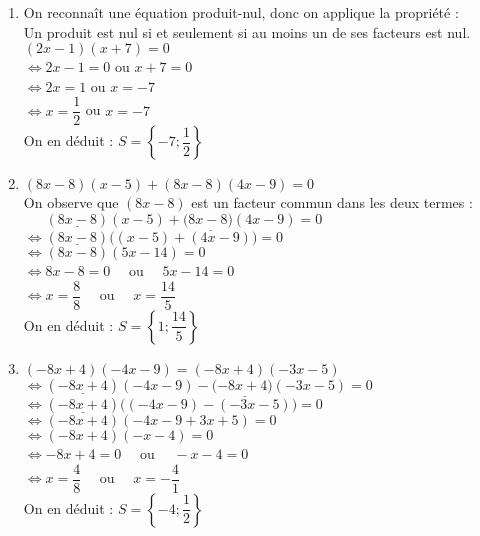 \documentclass[a4paper,11pt,exos]{nsi} %
\begin{document}
\begin{enumerate}
    \item On reconnaît une équation produit-nul, donc on applique la propriété :\\
    {\color[HTML]{f15929}Un produit est nul si et seulement si au moins un de ses facteurs est nul.}\\$(2x-1)(x+7)=0$\\$\iff 2x-1=0$ ou $x+7=0$\\$\iff 2x=1$ ou $ x=-7$\\$\iff x=\dfrac{1}{2}$ ou $ x=-7$\\On en déduit :  $S=\left\{-7;\dfrac{1}{2}\right\}$

    \item  $(8x-8)( x-5)+(8x-8)(4x-9)=0$\\ 
    On observe que $(8x-8)$ est un facteur commun dans les deux termes :
    \\ $\phantom{\iff} (\underline{8x-8})( x-5)+(\underline{8x-8)}( 4x-9)=0$\\ 
    $\iff (\underline{8x-8})\Big(( x-5)+(4x-9)\Big)=0$\\ 
    $\iff (8x-8)( 5x-14)=0$\\
    $\iff 8x-8=0\quad$ ou $\quad 5x-14=0$\\
    $\iff x=\dfrac{8}{8}\quad$ ou $\quad x=\dfrac{14}{5}$\\
    On en déduit :  $S=\left\{1;\dfrac{14}{5}\right\}$

    \item  $(-8x+4)( -4x-9)=( -8x+4)( -3x-5)$\\ 
    $\iff(\underline{-8x+4})( -4x-9)- (\underline{-8x+4)}( -3x-5)=0$\\ 
    $\iff (\underline{-8x+4})\Big(( -4x-9)-( -3x-5)\Big)=0$\\ 
    $\iff (-8x+4)( -4x-9+3x+5)=0$\\ $\iff (-8x+4)( -x-4)=0$\\
    $\iff -8x+4=0\quad$ ou $\quad -x-4=0$\\
    $\iff x=\dfrac{4}{8}\quad$ ou $\quad x=-\dfrac{4}{1}$\\
    On en déduit :  $S=\left\{-4;\dfrac{1}{2}\right\}$

\end{enumerate}
\end{document}

